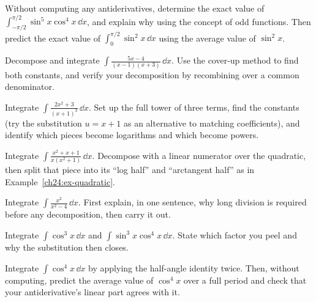 \begin{exercise}
Without computing any antiderivatives, determine the exact value of
$\displaystyle \int_{-\pi/2}^{\pi/2} \sin^5 x \cos^4 x\,\dd x$, and explain why using the concept of odd functions.
Then predict the exact value of $\displaystyle \int_0^{\pi/2} \sin^2 x\,\dd x$ using the average value of $\sin^2 x$.
\end{exercise}

\begin{exercise}
Decompose and integrate $\displaystyle \int \frac{5x - 4}{(x-1)(x+3)}\,\dd x.$
Use the cover-up method to find both constants, and verify your decomposition
by recombining over a common denominator.
\end{exercise}

\begin{exercise}
Integrate $\displaystyle \int \frac{2x^2 + 3}{(x+1)^3}\,\dd x.$ Set up the full
tower of three terms, find the constants (try the substitution $u = x+1$ as an
alternative to matching coefficients), and identify which pieces become
logarithms and which become powers.
\end{exercise}

\begin{exercise}
Integrate $\displaystyle \int \frac{x^2 + x + 1}{x(x^2+1)}\,\dd x.$ Decompose
with a linear numerator over the quadratic, then split that piece into its
``log half'' and ``arctangent half'' as in
Example~\ref{ch24:ex-quadratic}.
\end{exercise}

\begin{exercise}
Integrate $\displaystyle \int \frac{x^2}{x^2 - 4}\,\dd x.$ First explain, in
one sentence, why long division is required before any decomposition, then
carry it out.
\end{exercise}

\begin{exercise}
Integrate $\displaystyle \int \cos^3 x\,\dd x$ and
$\displaystyle \int \sin^3 x\cos^4 x\,\dd x.$ State which factor you peel and
why the substitution then closes.
\end{exercise}

\begin{exercise}
Integrate $\displaystyle \int \cos^4 x\,\dd x$ by applying the half-angle
identity twice. Then, without computing, predict the average value of
$\cos^4 x$ over a full period and check that your antiderivative's linear part
agrees with it.
\end{exercise}

